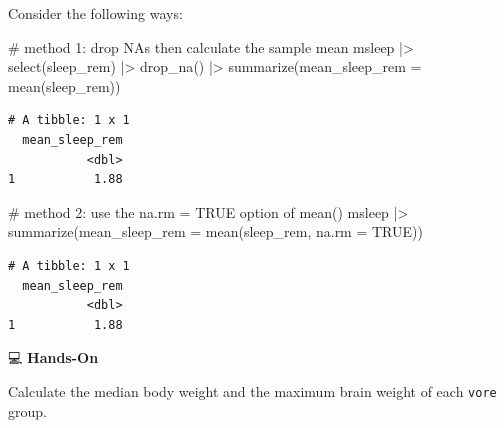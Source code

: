 \documentclass[
  letterpaper,
  DIV=11,
  numbers=noendperiod]{scrreprt}
\newenvironment{Shaded}{\begin{snugshade}}{\end{snugshade}}
\newcommand{\AttributeTok}[1]{\textcolor[rgb]{0.40,0.45,0.13}{#1}}
\newcommand{\CommentTok}[1]{\textcolor[rgb]{0.37,0.37,0.37}{#1}}
\newcommand{\ConstantTok}[1]{\textcolor[rgb]{0.56,0.35,0.01}{#1}}
\newcommand{\FunctionTok}[1]{\textcolor[rgb]{0.28,0.35,0.67}{#1}}
\newcommand{\NormalTok}[1]{\textcolor[rgb]{0.00,0.23,0.31}{#1}}
\newcommand{\SpecialCharTok}[1]{\textcolor[rgb]{0.37,0.37,0.37}{#1}}
\begin{document}
\begin{tcolorbox}[enhanced jigsaw, colbacktitle=quarto-callout-tip-color!10!white, opacitybacktitle=0.6, breakable, left=2mm, leftrule=.75mm, toprule=.15mm, toptitle=1mm, bottomtitle=1mm, colframe=quarto-callout-tip-color-frame, opacityback=0, coltitle=black, arc=.35mm, titlerule=0mm, colback=white, bottomrule=.15mm, title=\textcolor{quarto-callout-tip-color}{\faLightbulb}\hspace{0.5em}{Answer}, rightrule=.15mm]

Consider the following ways:

\begin{Shaded}
\begin{Highlighting}[]
\CommentTok{\# method 1: drop NAs then calculate the sample mean}
\NormalTok{msleep }\SpecialCharTok{|\textgreater{}}
  \FunctionTok{select}\NormalTok{(sleep\_rem) }\SpecialCharTok{|\textgreater{}}
  \FunctionTok{drop\_na}\NormalTok{() }\SpecialCharTok{|\textgreater{}}
  \FunctionTok{summarize}\NormalTok{(}\AttributeTok{mean\_sleep\_rem =} \FunctionTok{mean}\NormalTok{(sleep\_rem))}
\end{Highlighting}
\end{Shaded}

\begin{verbatim}
# A tibble: 1 x 1
  mean_sleep_rem
           <dbl>
1           1.88
\end{verbatim}

\begin{Shaded}
\begin{Highlighting}[]
\CommentTok{\# method 2: use the na.rm = TRUE option of mean()}
\NormalTok{msleep }\SpecialCharTok{|\textgreater{}}
  \FunctionTok{summarize}\NormalTok{(}\AttributeTok{mean\_sleep\_rem =} \FunctionTok{mean}\NormalTok{(sleep\_rem, }\AttributeTok{na.rm =} \ConstantTok{TRUE}\NormalTok{))}
\end{Highlighting}
\end{Shaded}

\begin{verbatim}
# A tibble: 1 x 1
  mean_sleep_rem
           <dbl>
1           1.88
\end{verbatim}

\end{tcolorbox}

💻 \textbf{Hands-On}

Calculate the median body weight and the maximum brain weight of each
\texttt{vore} group.
\end{document}
